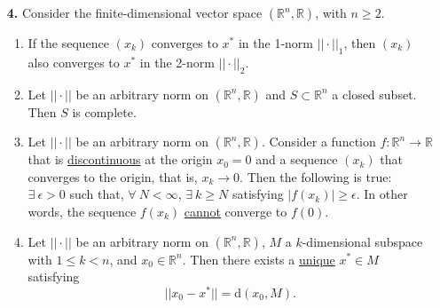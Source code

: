\documentclass[letterpaper]{article}
\newcommand{\real}{\mathbb R}  %
\begin{document}
\begin{enumerate}
\item[{\bf 4.}]  Consider the finite-dimensional vector space $(\real^n, \real )$, with $n\ge 2$.
\begin{enumerate}
\setlength{\itemsep}{.15in}
\renewcommand{\labelenumi}{(\alph{enumi})}
\setlength{\itemsep}{.1in}

\item If the sequence $(x_k)$ converges to $x^*$ in the 1-norm $||\cdot||_1$, then $(x_k)$ also converges to $x^*$ in the 2-norm $||\cdot||_2.$


    \item  Let $||\cdot||$ be an arbitrary norm on $(\real^n, \real )$ and $S \subset \real^n$ a closed subset. Then $S$ is complete.

\item  Let $||\cdot||$ be an arbitrary norm on $(\real^n, \real )$. Consider a function $f:\real^n \to \real$ that is \underline{discontinuous} at the origin $x_0=0$ and a sequence $(x_k)$ that converges to the origin, that is, $x_k \to 0$. Then the following is true: $\exists~\epsilon>0$ such that, $\forall~N < \infty$, $\exists~k \ge N$ satisfying $|f(x_k)| \ge \epsilon$. In other words, the sequence $f(x_k)$ \underline{cannot} converge to $f(0)$.

\item  Let $||\cdot||$ be an arbitrary norm on $(\real^n, \real )$, $M$ a $k$-dimensional subspace with $1 \le k < n$, and $x_0 \in \real^n$. Then there exists a \underline{unique} $x^*\in M$ satisfying $$||x_0-x^*|| = \mathrm{d}(x_0,M).$$


\end{enumerate}


\newpage



\end{enumerate}
\end{document}
